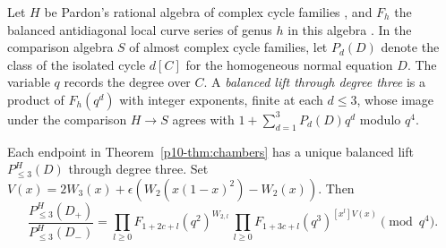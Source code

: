 Let $H$ be Pardon's rational algebra of complex cycle families
\cite{pardon}, and $F_h$ the balanced antidiagonal local curve series
of genus $h$ in this algebra \cite{WueProduct}. In the comparison
algebra $S$ of almost complex cycle families, let $P_d(D)$ denote
the class of the isolated cycle $d[C]$ for the homogeneous normal
equation $D$. The variable $q$ records the degree over $C$. A
\emph{balanced lift through degree three} is a product of
$F_h(q^d)$ with integer exponents, finite at each $d\le3$, whose
image under the comparison $H\to S$ agrees with
$1+\sum_{d=1}^3P_d(D)q^d$ modulo $q^4$.

\begin{theorem}\label{p10-thm:product}
Each endpoint in Theorem~\ref{p10-thm:chambers} has a unique balanced lift
$P^H_{\le3}(D)$ through degree three. Set
$V(x)=2W_3(x)+\epsilon(W_2(x(1-x)^2)-W_2(x))$. Then
\[
 \frac{P^H_{\le3}(D_+)}{P^H_{\le3}(D_-)}
 =\prod_{l\ge0}F_{1+2c+l}(q^2)^{W_{2,l}}\,
  \prod_{l\ge0}F_{1+3c+l}(q^3)^{[x^l]V(x)}
       \pmod{q^4}.
\]
\end{theorem}
